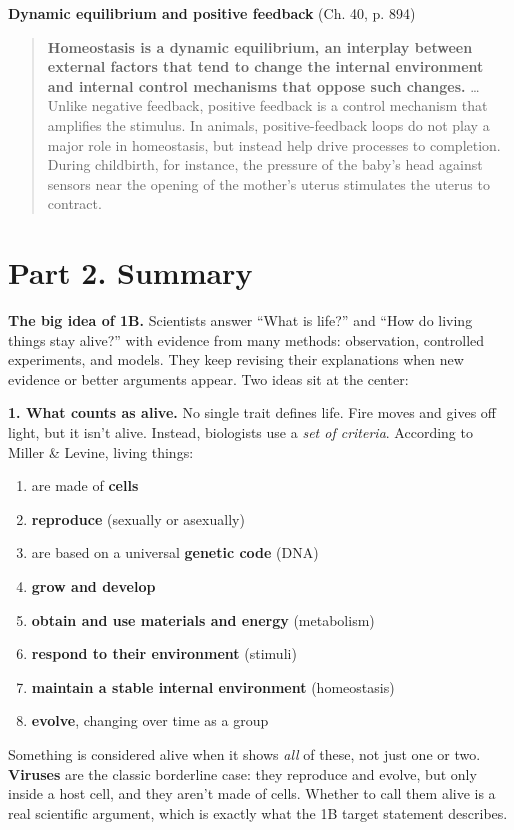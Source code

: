 \documentclass[11pt,letterpaper]{article}
\begin{document}
\textbf{Dynamic equilibrium and positive feedback} (Ch. 40, p. 894)

\begin{quote}
\textbf{Homeostasis is a dynamic equilibrium, an interplay between external factors that tend to change the internal environment and internal control mechanisms that oppose such changes.} \dots{} Unlike negative feedback, positive feedback is a control mechanism that amplifies the stimulus. In animals, positive-feedback loops do not play a major role in homeostasis, but instead help drive processes to completion. During childbirth, for instance, the pressure of the baby's head against sensors near the opening of the mother's uterus stimulates the uterus to contract.
\end{quote}

\section{Part 2. Summary}

\textbf{The big idea of 1B.} Scientists answer ``What is life?'' and ``How do living things stay alive?'' with evidence from many methods: observation, controlled experiments, and models. They keep revising their explanations when new evidence or better arguments appear. Two ideas sit at the center:

\textbf{1. What counts as alive.} No single trait defines life. Fire moves and gives off light, but it isn't alive. Instead, biologists use a \emph{set of criteria}. According to Miller \& Levine, living things:
\begin{enumerate}
  \item are made of \textbf{cells}
  \item \textbf{reproduce} (sexually or asexually)
  \item are based on a universal \textbf{genetic code} (DNA)
  \item \textbf{grow and develop}
  \item \textbf{obtain and use materials and energy} (metabolism)
  \item \textbf{respond to their environment} (stimuli)
  \item \textbf{maintain a stable internal environment} (homeostasis)
  \item \textbf{evolve}, changing over time as a group
\end{enumerate}

Something is considered alive when it shows \emph{all} of these, not just one or two. \textbf{Viruses} are the classic borderline case: they reproduce and evolve, but only inside a host cell, and they aren't made of cells. Whether to call them alive is a real scientific argument, which is exactly what the 1B target statement describes.
\end{document}
